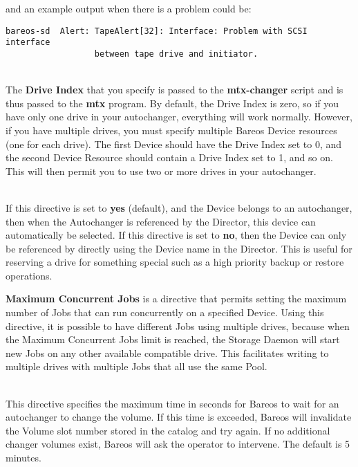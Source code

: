 \begin{description}
\begin{verbatim}
\end{verbatim}
\normalsize

and an example output when there is a problem could be:

\footnotesize
\begin{verbatim}
bareos-sd  Alert: TapeAlert[32]: Interface: Problem with SCSI interface
                  between tape drive and initiator.

\end{verbatim}
\normalsize

\item [Drive Index = {\textless}number{\textgreater}] \hfill \\
The {\bf Drive Index} that you specify is passed to the {\bf
mtx-changer} script and is thus passed to the {\bf mtx} program.  By
default, the Drive Index is zero, so if you have only one drive in your
autochanger, everything will work normally.  However, if you have
multiple drives, you must specify multiple Bareos Device resources (one
for each drive).  The first Device should have the Drive Index set to 0,
and the second Device Resource should contain a Drive Index set to 1,
and so on.  This will then permit you to use two or more drives in your
autochanger.

\item [Autoselect = {\textless}yes{\textbar}no{\textgreater}] \hfill \\
If this directive is set to {\bf yes} (default), and the Device
belongs to an autochanger, then when the Autochanger is referenced
by the Director, this device can automatically be selected. If this
directive is set to {\bf no}, then the Device can only be referenced
by directly using the Device name in the Director. This is useful
for reserving a drive for something special such as a high priority
backup or restore operations.

{\bf Maximum Concurrent Jobs} is a directive that permits setting the maximum
number of Jobs that can run concurrently on a specified Device.  Using this
directive, it is possible to have different Jobs using multiple drives, because
when the Maximum Concurrent Jobs limit is reached, the Storage Daemon will
start new Jobs on any other available compatible drive.  This facilitates
writing to multiple drives with multiple Jobs that all use the same Pool.

\item [Maximum Changer Wait = {\textless}time{\textgreater}] \hfill \\
This directive specifies the maximum time in seconds for Bareos to wait
for an autochanger to change the volume.  If this time is exceeded,
Bareos will invalidate the Volume slot number stored in the catalog and
try again.  If no additional changer volumes exist, Bareos will ask the
operator to intervene.  The default is 5 minutes.


\end{description}
